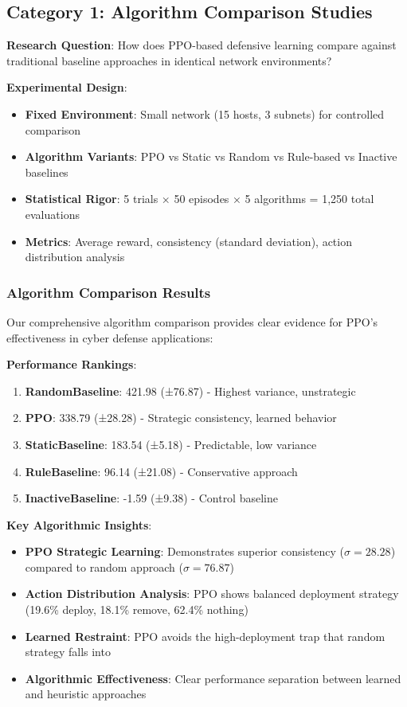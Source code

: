 \documentclass[12pt,oneside,a4paper]{article}
\theoremstyle{definition}
\theoremstyle{plain}
\begin{document}
\subsection{Category 1: Algorithm Comparison Studies}

\textbf{Research Question}: How does PPO-based defensive learning compare against traditional baseline approaches in identical network environments?

\textbf{Experimental Design}:
\begin{itemize}
\item \textbf{Fixed Environment}: Small network (15 hosts, 3 subnets) for controlled comparison
\item \textbf{Algorithm Variants}: PPO vs Static vs Random vs Rule-based vs Inactive baselines
\item \textbf{Statistical Rigor}: 5 trials × 50 episodes × 5 algorithms = 1,250 total evaluations
\item \textbf{Metrics}: Average reward, consistency (standard deviation), action distribution analysis
\end{itemize}

\subsubsection{Algorithm Comparison Results}

Our comprehensive algorithm comparison provides clear evidence for PPO's effectiveness in cyber defense applications:

\textbf{Performance Rankings}:
\begin{enumerate}
\item \textbf{RandomBaseline}: 421.98 (±76.87) - Highest variance, unstrategic
\item \textbf{PPO}: 338.79 (±28.28) - Strategic consistency, learned behavior  
\item \textbf{StaticBaseline}: 183.54 (±5.18) - Predictable, low variance
\item \textbf{RuleBaseline}: 96.14 (±21.08) - Conservative approach
\item \textbf{InactiveBaseline}: -1.59 (±9.38) - Control baseline
\end{enumerate}

\textbf{Key Algorithmic Insights}:
\begin{itemize}
\item \textbf{PPO Strategic Learning}: Demonstrates superior consistency ($\sigma=28.28$) compared to random approach ($\sigma=76.87$)
\item \textbf{Action Distribution Analysis}: PPO shows balanced deployment strategy (19.6\% deploy, 18.1\% remove, 62.4\% nothing)
\item \textbf{Learned Restraint}: PPO avoids the high-deployment trap that random strategy falls into
\item \textbf{Algorithmic Effectiveness}: Clear performance separation between learned and heuristic approaches
\end{itemize}
\end{document}
